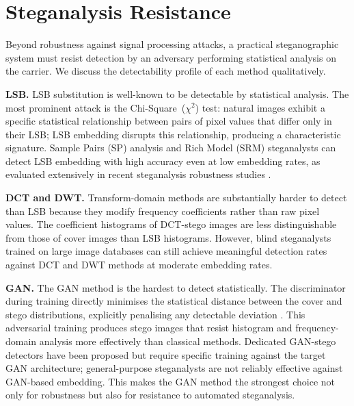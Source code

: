 \documentclass[conference]{IEEEtran}
\begin{document}
\section{Steganalysis Resistance}

Beyond robustness against signal processing attacks, a practical
steganographic system must resist detection by an adversary performing
statistical analysis on the carrier. We discuss the detectability
profile of each method qualitatively.

\textbf{LSB.} LSB substitution is well-known to be detectable by
statistical analysis. The most prominent attack is the
Chi-Square~($\chi^2$) test: natural images exhibit a
specific statistical relationship between pairs of pixel values that
differ only in their LSB; LSB embedding disrupts this relationship,
producing a characteristic signature. Sample Pairs (SP) analysis and
Rich Model (SRM) steganalysts can detect LSB embedding with high
accuracy even at low embedding rates, as evaluated extensively in
recent steganalysis robustness studies \cite{b6}.

\textbf{DCT and DWT.} Transform-domain methods are substantially
harder to detect than LSB because they modify frequency coefficients
rather than raw pixel values. The coefficient histograms of DCT-stego
images are less distinguishable from those of cover images than LSB
histograms. However, blind steganalysts trained on large image
databases \cite{b6} can still achieve meaningful detection rates
against DCT and DWT methods at moderate embedding rates.

\textbf{GAN.} The GAN method is the hardest to detect statistically.
The discriminator during training directly minimises the statistical
distance between the cover and stego distributions, explicitly
penalising any detectable deviation \cite{b11}. This adversarial
training produces stego images that resist histogram and
frequency-domain analysis more effectively than classical methods.
Dedicated GAN-stego detectors \cite{b12} have been proposed but
require specific training against the target GAN architecture;
general-purpose steganalysts are not reliably effective against
GAN-based embedding. This makes the GAN method the strongest choice
not only for robustness but also for resistance to automated
steganalysis.

\newpage
\end{document}
